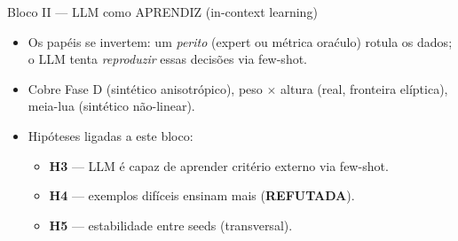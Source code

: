\documentclass[aspectratio=169,10pt]{beamer}
\begin{document}
\begin{frame}{Bloco II --- LLM como APRENDIZ (in-context learning)}
  \footnotesize
  \begin{itemize}
    \item Os pap\'eis se invertem: um \emph{perito} (expert ou m\'etrica ora\'culo) rotula os dados; o LLM tenta \emph{reproduzir} essas decis\~oes via few-shot.
    \item Cobre Fase D (sint\'etico anisotr\'opico), peso $\times$ altura (real, fronteira el\'iptica), meia-lua (sint\'etico n\~ao-linear).
    \item Hip\'oteses ligadas a este bloco:
      \begin{itemize}
        \item \textbf{H3} — LLM \'e capaz de aprender crit\'erio externo via few-shot.
        \item \textbf{H4} — exemplos dif\'iceis ensinam mais (\textbf{REFUTADA}).
        \item \textbf{H5} — estabilidade entre seeds (transversal).
      \end{itemize}
  \end{itemize}
\end{frame}
\end{document}
